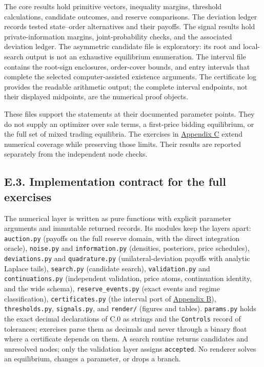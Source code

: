 \documentclass[
  11pt,
]{article}
\begin{document}
The core results hold primitive vectors, inequality margins, threshold
calculations, candidate outcomes, and reserve comparisons. The deviation
ledger records tested state--order alternatives and their payoffs. The
signal results hold private-information margins, joint-probability
checks, and the associated deviation ledger. The asymmetric candidate
file is exploratory: its root and local-search output is not an
exhaustive equilibrium enumeration. The interval file contains the
root-sign enclosures, order-cover bounds, and entry intervals that
complete the selected computer-assisted existence arguments. The
certificate log provides the readable arithmetic output; the complete
interval endpoints, not their displayed midpoints, are the numerical
proof objects.

These files support the statements at their documented parameter points.
They do not supply an optimizer over sale terms, a first-price bidding
equilibrium, or the full set of mixed trading equilibria. The exercises
in \hyperref[oa-c]{Appendix C} extend numerical coverage while
preserving those limits. Their results are reported separately from the
independent node checks.

\subsection{E.3. Implementation contract for the full
exercises}\label{oa-e-contract}

The numerical layer is written as pure functions with explicit parameter
arguments and immutable returned records. Its modules keep the layers
apart: \texttt{auction.py} (payoffs on the full reserve domain, with the
direct integration oracle), \texttt{noise.py} and
\texttt{information.py} (densities, posteriors, price schedules),
\texttt{deviations.py} and \texttt{quadrature.py} (unilateral-deviation
payoffs with analytic Laplace tails), \texttt{search.py} (candidate
search), \texttt{validation.py} and \texttt{continuations.py}
(independent validation, price atoms, continuation identity, and the
wide schema), \texttt{reserve\_events.py} (exact events and regime
classification), \texttt{certificates.py} (the interval port of
\hyperref[oa-b]{Appendix B}), \texttt{thresholds.py},
\texttt{signals.py}, and \texttt{render/} (figures and tables).
\texttt{params.py} holds the exact decimal declarations of C.0 as
strings and the \texttt{Controls} record of tolerances; exercises parse
them as decimals and never through a binary float where a certificate
depends on them. A search routine returns candidates and unresolved
nodes; only the validation layer assigns \texttt{accepted}. No renderer
solves an equilibrium, changes a parameter, or drops a branch.
\end{document}
